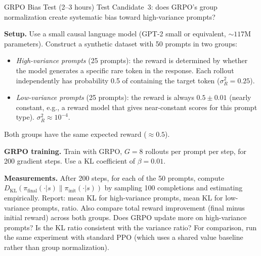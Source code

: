 \begin{exercise}{GRPO Bias Test (2--3 hours)}
Test Candidate~3: does GRPO's group normalization create systematic bias toward high-variance prompts?

\textbf{Setup.} Use a small causal language model (GPT-2 small or equivalent, $\sim 117$M parameters). Construct a synthetic dataset with 50 prompts in two groups:

\begin{itemize}
  \item \textit{High-variance prompts} (25 prompts): the reward is determined by whether the model generates a specific rare token in the response. Each rollout independently has probability 0.5 of containing the target token ($\sigma^2_R = 0.25$).
  \item \textit{Low-variance prompts} (25 prompts): the reward is always $0.5 \pm 0.01$ (nearly constant, e.g., a reward model that gives near-constant scores for this prompt type). $\sigma^2_R \approx 10^{-4}$.
\end{itemize}

Both groups have the same expected reward ($\approx 0.5$).

\textbf{GRPO training.} Train with GRPO, $G = 8$ rollouts per prompt per step, for 200 gradient steps. Use a KL coefficient of $\beta = 0.01$.

\textbf{Measurements.} After 200 steps, for each of the 50 prompts, compute $D_{\mathrm{KL}}(\pi_{\text{final}}(\cdot|s) \| \pi_{\text{init}}(\cdot|s))$ by sampling 100 completions and estimating empirically. Report: mean KL for high-variance prompts, mean KL for low-variance prompts, ratio. Also compare total reward improvement (final minus initial reward) across both groups. Does GRPO update more on high-variance prompts? Is the KL ratio consistent with the variance ratio? For comparison, run the same experiment with standard PPO (which uses a shared value baseline rather than group normalization).
\end{exercise}

